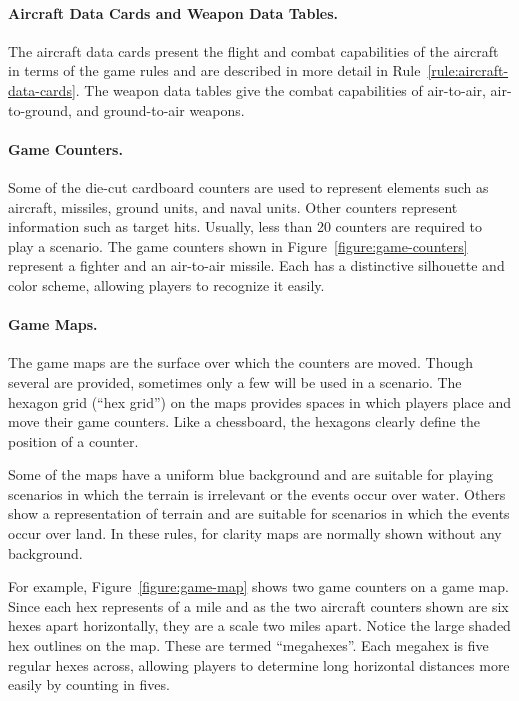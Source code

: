 {\paragraph{Aircraft Data Cards and Weapon Data Tables.} The aircraft data cards present the flight and combat capabilities of the aircraft in terms of the game rules and are described in more detail in Rule~\ref{rule:aircraft-data-cards}. The weapon data tables give the combat capabilities of air-to-air, air-to-ground, and ground-to-air weapons.

\paragraph{Game Counters.} Some of the die-cut cardboard counters are used to represent elements such as aircraft, missiles,  ground units, and naval units. Other counters represent information such as target hits. Usually, less than 20 counters are required to play a scenario. The game counters shown in Figure~\ref{figure:game-counters} represent a fighter and an air-to-air missile. Each has a distinctive silhouette and color scheme, allowing players to recognize it easily.

\paragraph{Game Maps.} The game maps are the surface over which the counters are moved. Though several are provided, sometimes only a few will be used in a scenario. The hexagon grid (“hex grid”) on the maps provides spaces in which players place and move their game counters. Like a chessboard, the hexagons clearly define the position of a counter.

Some of the maps have a uniform blue background and are suitable for playing scenarios in which the terrain is irrelevant or the events occur over water. Others show a representation of terrain and are suitable for scenarios in which the events occur over land. In these rules, for clarity maps are normally shown without any background.

For example, Figure~\ref{figure:game-map} shows two game counters on a game map. Since each hex represents {\onethird} of a mile and as the two aircraft counters shown are six hexes apart horizontally, they are a scale two miles apart. Notice the large shaded hex outlines on the map. These are termed “megahexes”. Each megahex is five regular hexes across, allowing players to determine long horizontal distances more easily by counting in fives.

}
